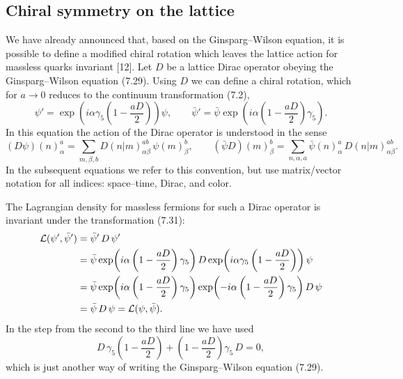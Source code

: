 \subsection{Chiral symmetry on the lattice}

We have already announced that, based on the Ginsparg--Wilson equation, it is
possible to define a modified chiral rotation which leaves the lattice action
for massless quarks invariant [12]. Let $D$ be a lattice Dirac operator
obeying the Ginsparg--Wilson equation (7.29). Using $D$ we can define a chiral
rotation, which for $a \to 0$ reduces to the continuum transformation (7.2),
\begin{equation}
  \psi' = \exp\!\left(i\alpha\gamma_5\left(1-\frac{aD}{2}\right)\right)\psi,
  \qquad
  \bar\psi' = \bar\psi\exp\!\left(i\alpha\left(1-\frac{aD}{2}\right)\gamma_5\right).
\end{equation}
In this equation the action of the Dirac operator is understood in the sense
\begin{equation}
  (D\psi)(n)^a_\alpha = \sum_{m,\beta,b} D(n|m)^{ab}_{\alpha\beta}\,\psi(m)^b_\beta,
  \qquad
  (\bar\psi D)(m)^b_\beta = \sum_{n,\alpha,a} \bar\psi(n)^a_\alpha\,D(n|m)^{ab}_{\alpha\beta}.
\end{equation}
In the subsequent equations we refer to this convention, but use
matrix/vector notation for all indices: space--time, Dirac, and color.

The Lagrangian density for massless fermions for such a Dirac operator is
invariant under the transformation (7.31):
\begin{align}
  \mathcal{L}(\psi',\bar\psi') &= \bar\psi'\,D\,\psi' \notag\\
  &= \bar\psi\exp\!\left(i\alpha\left(1-\frac{aD}{2}\right)\gamma_5\right)D
     \exp\!\left(i\alpha\gamma_5\left(1-\frac{aD}{2}\right)\right)\psi \notag\\
  &= \bar\psi\exp\!\left(i\alpha\left(1-\frac{aD}{2}\right)\gamma_5\right)
     \exp\!\left(-i\alpha\left(1-\frac{aD}{2}\right)\gamma_5\right)D\,\psi \notag\\
  &= \bar\psi\,D\,\psi = \mathcal{L}(\psi,\bar\psi) .
\end{align}
In the step from the second to the third line we have used
\begin{equation}
  D\,\gamma_5\left(1-\frac{aD}{2}\right) + \left(1-\frac{aD}{2}\right)\gamma_5\,D = 0,
\end{equation}
which is just another way of writing the Ginsparg--Wilson equation (7.29).

